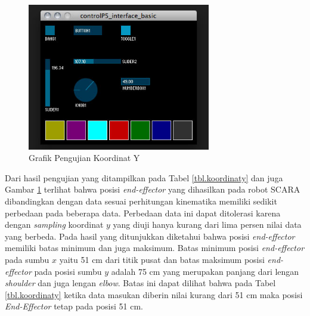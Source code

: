  \begin{figure}[H]
 	\centering
 	\includegraphics[width=8cm]{gambar/controlp5.jpg}
 	\caption{Grafik Pengujian Koordinat Y}
 	\label{pic.koordinaty}
 \end{figure}


Dari hasil pengujian yang ditampilkan pada Tabel \ref{tbl.koordinaty} dan juga Gambar \ref{pic.koordinaty} terlihat bahwa posisi \textit{end-effector} yang dihasilkan pada robot SCARA dibandingkan dengan data sesuai perhitungan kinematika memiliki sedikit perbedaan pada beberapa data. Perbedaan data ini dapat ditolerasi karena dengan \textit{sampling} koordinat $y$ yang diuji hanya kurang dari lima persen nilai data yang berbeda. Pada hasil yang ditunjukkan diketahui bahwa posisi \textit{end-effector} memiliki batas minimum dan juga maksimum. Batas minimum posisi \textit{end-effector} pada sumbu $x$ yaitu 51 cm dari titik pusat dan batas maksimum posisi \textit{end-effector} pada posisi sumbu $y$ adalah 75 cm yang merupakan panjang dari lengan \textit{shoulder} dan juga lengan \textit{elbow}.  Batas ini dapat dilihat bahwa pada Tabel \ref{tbl.koordinaty} ketika data masukan diberin nilai kurang dari 51 cm maka posisi \textit{End-Effector} tetap pada posisi 51 cm.
